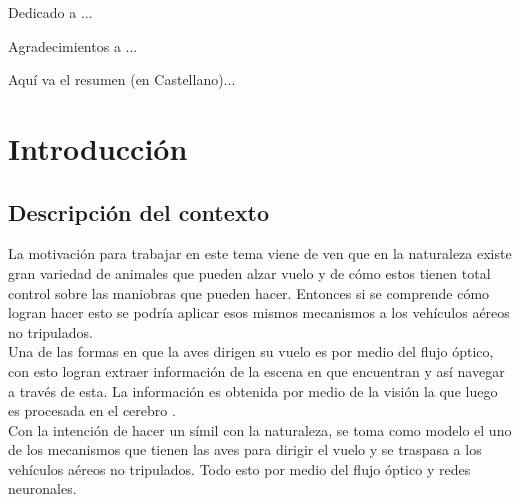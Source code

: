 \documentclass{iccmemoria}
\author{Jorge Gómez Valderrama}
\date{mes, año}
\begin{document}
\maketitle

\begin{dedicatory}
Dedicado a ...
\end{dedicatory}

\begin{acknowledgment}
Agradecimientos a ...
\end{acknowledgment}

\tableofcontents
\listoffigures
\listoftables
\listofalgorithms

\begin{resumen}
Aquí va el resumen (en Castellano)... 
\end{resumen}


\chapter{Introducción}

\section{Descripción del contexto}

La motivación para trabajar en este tema viene de ven que en la naturaleza existe gran variedad de animales que pueden alzar vuelo y de cómo estos tienen total control sobre las maniobras que pueden hacer. Entonces si se comprende cómo logran hacer esto se podría aplicar esos mismos mecanismos a los vehículos aéreos no tripulados.\\

Una de las formas en que la aves dirigen su vuelo es por medio del flujo óptico, con esto logran extraer información de la escena en que encuentran y así navegar a través de esta. La información es obtenida por medio de la visión la que luego es procesada en el cerebro \cite{bhagavatula2011optic}.\\

Con la intención de hacer un símil con la naturaleza, se toma como modelo el uno de los mecanismos que tienen las aves para dirigir el vuelo y se traspasa a los vehículos aéreos no tripulados. Todo esto por medio del flujo óptico y redes neuronales.\\
\end{document}

